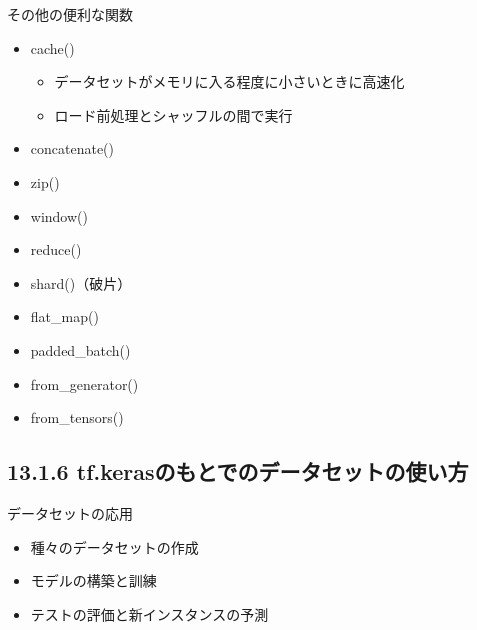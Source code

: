 \documentclass[aspectratio=169, dvipdfmx, 14pt, xcolor={svgnames,dvipsnames}, t]{beamer}
\begin{document}
\begin{frame}{その他の便利な関数}

  \begin{itemize}
    \tightlist
    \item
          cache()

          \begin{itemize}
            \tightlist
            \item
                  データセットがメモリに入る程度に小さいときに高速化
            \item
                  ロード前処理とシャッフルの間で実行
          \end{itemize}
    \item
          concatenate()
    \item
          zip()
    \item
          window()
    \item
          reduce()
    \item
          shard()（破片）
    \item
          flat\_map()
    \item
          padded\_batch()
    \item
          from\_generator()
    \item
          from\_tensors()
  \end{itemize}

\end{frame}


\hypertarget{tf.kerasux306eux3082ux3068ux3067ux306eux30c7ux30fcux30bfux30bbux30c3ux30c8ux306eux4f7fux3044ux65b9}{%
  \subsection{13.1.6 tf.kerasのもとでのデータセットの使い方}\label{tf.kerasux306eux3082ux3068ux3067ux306eux30c7ux30fcux30bfux30bbux30c3ux30c8ux306eux4f7fux3044ux65b9}}


\begin{frame}{データセットの応用}

  \begin{itemize}
    \tightlist
    \item
          種々のデータセットの作成
    \item
          モデルの構築と訓練
    \item
          テストの評価と新インスタンスの予測
  \end{itemize}

\end{frame}
\end{document}
